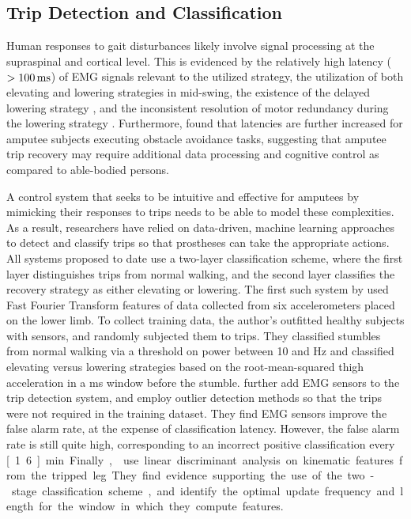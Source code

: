 \subsection{Trip Detection and Classification}
Human responses to gait disturbances likely involve signal processing at the
supraspinal and cortical level. This is evidenced by the relatively high latency
($>\unit[100]{ms}$) of EMG signals relevant to the utilized strategy, the
utilization of both elevating and lowering strategies in mid-swing, the
existence of the delayed lowering strategy \citep{schillings2000muscular}, and
the inconsistent resolution of motor redundancy during the lowering strategy
\citep{eng1994strategies}. Furthermore, \citet{hofstad2009evidence} found that
latencies are further increased for amputee subjects executing obstacle
avoidance tasks, suggesting that amputee trip recovery may require additional
data processing and cognitive control as compared to able-bodied persons. 

A control system that seeks to be intuitive and effective for amputees by
mimicking their responses to trips needs to be able to model these complexities.
As a result, researchers have relied on data-driven, machine learning approaches
to detect and classify trips so that prostheses can take the appropriate
actions. All systems proposed to date use a two-layer classification scheme,
where the first layer distinguishes trips from normal walking, and the second
layer classifies the recovery strategy as either elevating or lowering.  The
first such system by \citet{lawson2010stumble} used Fast Fourier Transform
features of data collected from six accelerometers placed on the lower limb. To
collect training data, the author's outfitted healthy subjects with sensors, and
randomly subjected them to trips. They classified stumbles from normal walking
via a threshold on power between 10 and \unit[40]{Hz} and classified elevating
versus lowering strategies based on the root-mean-squared thigh acceleration in
a \unit[50]{ms} window before the stumble. \citet{zhang2011towards} further add
EMG sensors to the trip detection system, and employ outlier detection methods
so that the trips were not required in the training dataset. They find EMG
sensors improve the false alarm rate, at the expense of classification latency.
However, the false alarm rate is still quite high, corresponding to an incorrect
positive classification every \unit[1.6]{min}. Finally,
\citet{shirota2014recovery} use linear discriminant analysis on kinematic
features from the tripped leg. They find evidence supporting the use of the
two-stage classification scheme, and identify the optimal update frequency and
length for the window in which they compute features.

